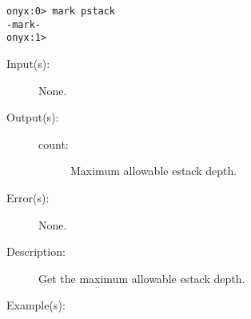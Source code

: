 \begin{description}
\begin{description}
\begin{verbatim}
onyx:0> mark pstack
-mark-
onyx:1>
		\end{verbatim}
	\end{description}
\label{systemdict:maxestack}
\item[{\onyxop{--}{maxestack}{count}}: ]
	\begin{description}\item[]
	\item[Input(s): ] None.
	\item[Output(s): ]
		\begin{description}\item[]
		\item[count: ]
			Maximum allowable estack depth.
		\end{description}
	\item[Error(s): ] None.
	\item[Description: ]
		Get the maximum allowable estack depth.
	\item[Example(s): ]\begin{verbatim}


\end{verbatim}
\end{description}
\end{description}
